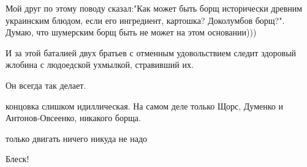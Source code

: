 \begin{itemize}
 

Мой друг по этому поводу сказал:"Как может быть борщ исторически древним
украинским блюдом, если его ингредиент, картошка? Доколумбов борщ?". Думаю, что
шумерским борщ быть не может на этом основании)))


 

И за этой баталией двух братьев с отменным удовольствием следит здоровый
жлобина с людоедской ухмылкой, стравивший их.

\begin{itemize}
 
Он всегда так делает.
\end{itemize}

 
концовка слишком идиллическая. На самом деле только Щорс, Думенко и Антонов-Овсеенко, никакого борща.

 
только двигать ничего никуда не надо

 
Блеск!

 

\end{itemize}

